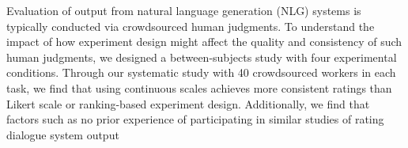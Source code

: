 Evaluation of output from natural language generation (NLG) systems is typically conducted via crowdsourced human judgments. To understand the impact of how experiment design might affect the quality and consistency of such human judgments, we designed a between-subjects study with four experimental conditions. Through our systematic study with 40 crowdsourced workers in each task, we find that using continuous scales achieves more consistent ratings than Likert scale or ranking-based experiment design. Additionally, we find that factors such as no prior experience of participating in similar studies of rating dialogue system output
